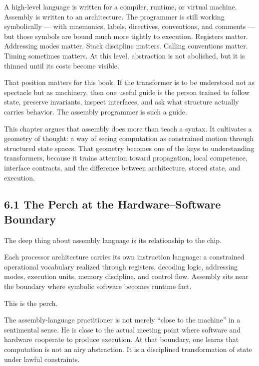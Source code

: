 A high-level language is written for a compiler, runtime, or virtual
machine. Assembly is written to an architecture. The programmer is still
working symbolically --- with mnemonics, labels, directives,
conventions, and comments --- but those symbols are bound much more
tightly to execution. Registers matter. Addressing modes matter. Stack
discipline matters. Calling conventions matter. Timing sometimes
matters. At this level, abstraction is not abolished, but it is thinned
until its costs become visible.

That position matters for this book. If the transformer is to be
understood not as spectacle but as machinery, then one useful guide is
the person trained to follow state, preserve invariants, inspect
interfaces, and ask what structure actually carries behavior. The
assembly programmer is such a guide.

This chapter argues that assembly does more than teach a syntax. It
cultivates a geometry of thought: a way of seeing computation as
constrained motion through structured state spaces. That geometry
becomes one of the keys to understanding transformers, because it trains
attention toward propagation, local competence, interface contracts, and
the difference between architecture, stored state, and execution.

\hypertarget{the-perch-at-the-hardwaresoftware-boundary}{%
\subsection{6.1 The Perch at the Hardware--Software
Boundary}\label{the-perch-at-the-hardwaresoftware-boundary}}

The deep thing about assembly language is its relationship to the chip.

Each processor architecture carries its own instruction language: a
constrained operational vocabulary realized through registers, decoding
logic, addressing modes, execution units, memory discipline, and control
flow. Assembly sits near the boundary where symbolic software becomes
runtime fact.

This is the perch.

The assembly-language practitioner is not merely ``close to the
machine'' in a sentimental sense. He is close to the actual meeting
point where software and hardware cooperate to produce execution. At
that boundary, one learns that computation is not an airy abstraction.
It is a disciplined transformation of state under lawful constraints.

